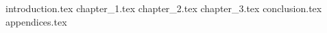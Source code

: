 \documentclass[a4paper,12pt,oneside,openbib,oldfontcommands]{memoir}
\newcommand{\clearemptydoublepage}{\newpage{\thispagestyle{empty}\cleardoublepage}}
\theoremstyle{plain}
\theoremstyle{plain}
\theoremstyle{plain}
\theoremstyle{definition}
\theoremstyle{plain}
\theoremstyle{plain}
\theoremstyle{plain}
\begin{document}
\frontmatter
{}


\clearemptydoublepage


\listoftables
{}
\newpage
\listoffigures
{}
\newpage
{}
\renewcommand{\contentsname}{Table of Contents}
\tableofcontents*
\mainmatter
{introduction.tex}
{chapter_1.tex}
{chapter_2.tex}
{chapter_3.tex}
{conclusion.tex}
\appendix
{appendices.tex}
\backmatter


\clearemptydoublepage
\end{document}
